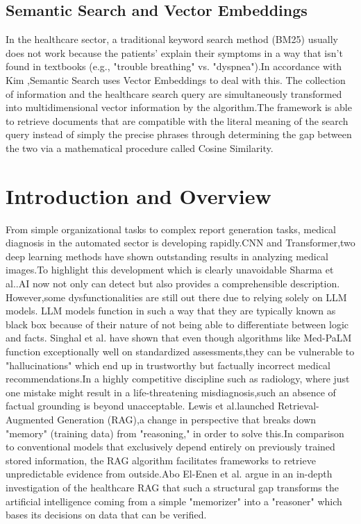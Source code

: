 \subsection{ Semantic Search and Vector Embeddings}
In the healthcare sector, a traditional keyword search method (BM25) usually does not work because the patients' explain their symptoms in a way that isn't found in textbooks (e.g., "trouble breathing" vs. "dyspnea").In accordance with Kim \cite{Kim2025},Semantic Search uses Vector Embeddings to deal with this. The collection of information and the healthcare search query are simultaneously transformed into multidimensional vector information by the algorithm.The framework is able to retrieve documents that are compatible with the literal meaning of the search query instead of simply the precise phrases through determining the gap between the two via a mathematical procedure called Cosine Similarity.
\section{Introduction and Overview}
From simple organizational tasks to complex report generation tasks, medical diagnosis in the automated sector is developing rapidly.CNN and Transformer,two deep learning methods have shown outstanding results in analyzing medical images.To highlight this development which is clearly unavoidable Sharma et al.\cite{Sharma2020}.AI now not only can detect but also provides a comprehensible description. 
However,some dysfunctionalities are still out there due to relying solely on LLM models. LLM models function in such a way that they are typically known as black box because of their nature of not being able to differentiate between logic and facts. Singhal et al.\cite{Singhal2022} have shown that even though algorithms like Med-PaLM function exceptionally well on standardized assessments,they can be vulnerable to "hallucinations" which end up in trustworthy but factually incorrect medical recommendations.In a highly competitive discipline such as radiology, where just one mistake might result in a life-threatening misdiagnosis,such an absence of factual grounding is beyond unacceptable.
Lewis et al.\cite{Lewis2020}launched Retrieval-Augmented Generation (RAG),a change in perspective that breaks down "memory" (training data) from "reasoning," in order to solve this.In comparison to conventional models that exclusively depend entirely on previously trained stored information, the RAG algorithm facilitates frameworks to retrieve unpredictable evidence from outside.Abo El-Enen et al.\cite{AboElEnen2025} argue in an in-depth investigation of the healthcare RAG that such a structural gap transforms the artificial intelligence coming from a simple "memorizer" into a "reasoner" which bases its decisions on data that can be verified.
